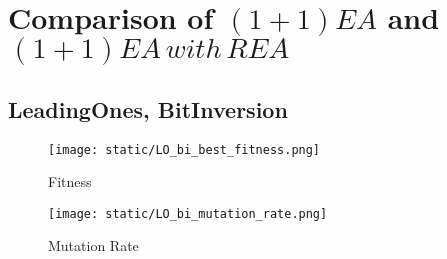 \documentclass{article}
\begin{document}
\section{Comparison of $(1+1)EA$ and $(1+1)EA\,with\,REA$}

%
%
%

\subsection{LeadingOnes, BitInversion}

\begin{figure}[H]
  \texttt{[image: static/LO\_bi\_best\_fitness.png]}
  \caption{Fitness}
\end{figure}
\begin{figure}[H]
  \texttt{[image: static/LO\_bi\_mutation\_rate.png]}
  \caption{Mutation Rate}
\end{figure}

%
\end{document}
